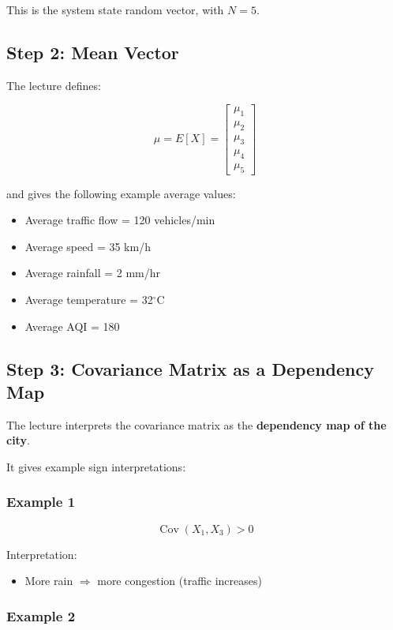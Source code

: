 \documentclass[12pt]{article}
\begin{document}
This is the system state random vector, with \(N=5\).

\subsection{Step 2: Mean Vector}

The lecture defines:

\[
\mu = E[X] =
\begin{bmatrix}
\mu_1 \\
\mu_2 \\
\mu_3 \\
\mu_4 \\
\mu_5
\end{bmatrix}
\]

and gives the following example average values:

\begin{itemize}
    \item Average traffic flow = 120 vehicles/min
    \item Average speed = 35 km/h
    \item Average rainfall = 2 mm/hr
    \item Average temperature = 32\(^\circ\)C
    \item Average AQI = 180
\end{itemize}

\subsection{Step 3: Covariance Matrix as a Dependency Map}

The lecture interprets the covariance matrix as the \textbf{dependency map of the city}.

It gives example sign interpretations:

\subsubsection*{Example 1}

\[
\operatorname{Cov}(X_1, X_3) > 0
\]

Interpretation:

\begin{itemize}
    \item More rain \(\Rightarrow\) more congestion (traffic increases)
\end{itemize}

\subsubsection*{Example 2}
\end{document}
